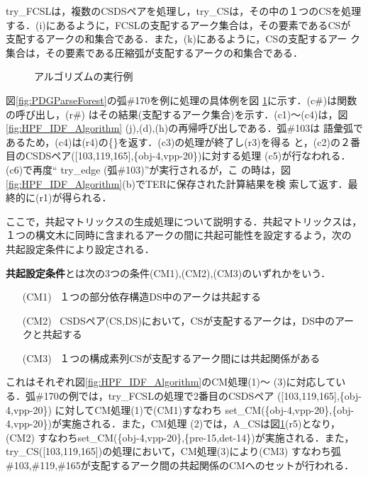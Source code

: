 try\_FCSLは，複数のCSDSペアを処理し，try\_CSは，その中の１つのCSを処理
する．(i)にあるように，FCSLの支配するアーク集合は，その要素であるCSが
支配するアークの和集合である．また，(k)にあるように，CSの支配するアー
ク集合は，その要素である圧縮弧が支配するアークの和集合である．

\begin{figure}[tbh]
 \begin{center}
 \end{center}
\myfiglabelskip
\caption{アルゴリズムの実行例}
\label{fig:TryEdgeFunctionExecution}
\end{figure}

図\ref{fig:PDGParseForest}の弧\#170を例に処理の具体例を図
\ref{fig:TryEdgeFunctionExecution}に示す．(c\#)は関数の呼び出し，(r\#)
はその結果(支配するアーク集合)を示す．(c1)〜(c4)は，図
\ref{fig:HPF_IDF_Algorithm} (j),(d),(h)の再帰呼び出しである．弧\#103は
語彙弧であるため，(c4)は(r4)の\{\}を返す．(c3)の処理が終了し(r3)を得る
と，(c2)の２番目のCSDSペア([103,119,165],\{obj-4,vpp-20\})に対する処理
(c5)が行なわれる．(c6)で再度`` try\_edge (弧\#103)''が実行されるが，こ
の時は，図\ref{fig:HPF_IDF_Algorithm}(b)でTERに保存された計算結果を検
索して返す．最終的に(r1)が得られる．

ここで，共起マトリックスの生成処理について説明する．共起マトリックスは，
１つの構文木に同時に含まれるアークの間に共起可能性を設定するよう，次の
共起設定条件により設定される．
\begin{definition} \label{def:CoocCondition}
{\bf 共起設定条件}とは次の3つの条件(CM1),(CM2),(CM3)のいずれかをいう．
\begin{itemize}
\item[{\mysmallitemindent}(CM1)]\ １つの部分依存構造DS中のアークは共起する
\item[{\mysmallitemindent}(CM2)]\ CSDSペア(CS,DS)において，CSが支配するアークは，DS中のアークと共起する
\item[{\mysmallitemindent}(CM3)]\ １つの構成素列CSが支配するアーク間には共起関係がある
\end{itemize}
\end{definition}
これはそれぞれ図\ref{fig:HPF_IDF_Algorithm}のCM処理(1)〜
(3)に対応している．弧\#170の例では，try\_FCSLの処理で2番目のCSDSペア
([103,119,165],\{obj-4,vpp-20\}) に対してCM処理(1)で(CM1)すなわち
set\_CM(\{obj-4,vpp-20\},\{obj-4,vpp-20\})が実施される．また，CM処理
(2)では，A\_CSは図\ref{fig:TryEdgeFunctionExecution}(r5)となり，(CM2)
すなわちset\_CM(\{obj-4,vpp-20\},\{pre-15,det-14\})が実施される．また，
try\_CS([103,119,165])の処理において，CM処理(3)により(CM3) すなわち弧
\#103,\#119,\#165が支配するアーク間の共起関係のCMへのセットが行われる．

